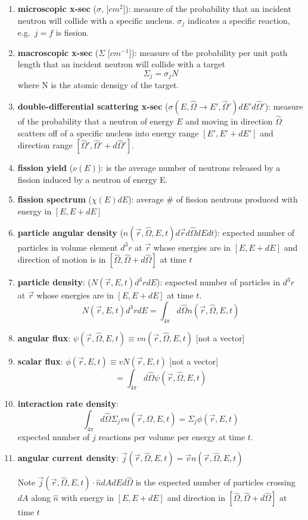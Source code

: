 \documentclass[12pt]{article}
\newcommand{\vOmega}{\ensuremath{\hat{\Omega}}}
\begin{document}
\begin{enumerate}
\item \textbf{microscopic x-sec} ($\sigma$, [$cm^2$]): measure of the probability that an incident neutron will collide with a specific nucleus. $\sigma_j$ indicates a specific reaction, e.g.\ $j=f$ is fission.

\item \textbf{macroscopic x-sec} ($\Sigma$ [$cm^{-1}$]): measure of the probability per unit path length that an incident neutron will collide with a target
\[\Sigma_j = \sigma_j N\]
where N is the atomic densigy of the target.

\item \textbf{double-differential scattering x-sec} ($\sigma(E, \vOmega \rightarrow E', \vOmega')dE' d\vOmega'$): measure of the probability that a neutron of energy $E$ and moving in direction $\vOmega$ scatters off of a specific nucleus into energy range $[E', E' + dE']$ and direction range $[\vOmega', \vOmega' + d\vOmega']$.

\item \textbf{fission yield} ($\nu(E)$): is the average number of neutrons released by a fission induced by a neutron of energy E.

\item \textbf{fission spectrum} ($\chi(E)dE$): average \# of fission neutrons produced with energy in $[E, E + dE]$

\item \textbf{particle angular density} ($n(\vec{r}, \vOmega, E, t)d\vec{r} d\vOmega dE dt$): expected number of particles in volume element $d^3r$ at $\vec{r}$ whose energies are in $[E, E + dE]$ and direction of motion is in $[\vOmega, \vOmega + d\vOmega]$ at time $t$

\item \textbf{particle density}: ($N(\vec{r},E,t)d^3r dE$): expected number of particles in $d^3r$ at $\vec{r}$ whose energies are in $[E, E + dE]$ at time $t$.
\[N(\vec{r},E,t)d^3r dE = \int_{4\pi} d\vOmega n(\vec{r}, \vOmega, E, t) \]

\item \textbf{angular flux}: $\psi(\vec{r}, \vOmega, E, t) \equiv v n(\vec{r}, \vOmega, E, t)$ [not a vector]

\item \textbf{scalar flux}: $\phi(\vec{r},E,t) \equiv v N(\vec{r},E,t)$ [not a vector]
\[= \int_{4\pi} d\vOmega \psi(\vec{r}, \vOmega, E, t) \]

\item \textbf{interaction rate density}:
\[\int_{4\pi} d\vOmega \Sigma_j v n(\vec{r}, \vOmega, E, t) = \Sigma_j \phi(\vec{r},E,t)\]
expected number of $j$ reactions per volume per energy at time $t$.

\item \textbf{angular current density}: $\vec{j}(\vec{r}, \vOmega, E, t) = \vec{v} n(\vec{r}, \vOmega, E, t)$ 

Note $\vec{j}(\vec{r}, \vOmega, E, t) \cdot \hat{n} dA dE d\vOmega$ is the expected number of particles crossing $dA$ along $\hat{n}$ with energy in $[E, E + dE]$ and direction in $[\vOmega, \vOmega + d\vOmega]$ at time $t$
\end{enumerate}
\end{document}
